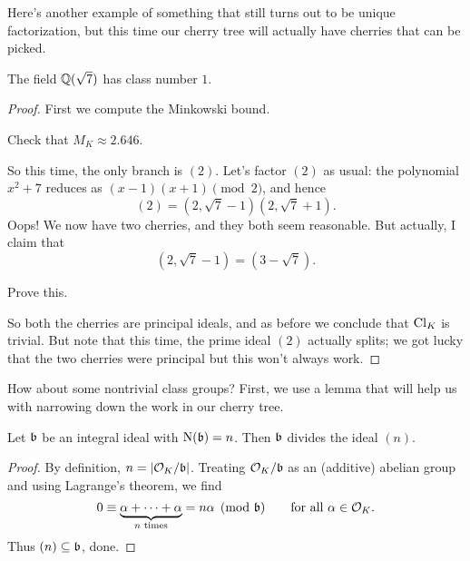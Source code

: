 Here's another example of something that still turns out to be unique factorization,
but this time our cherry tree will actually have cherries that can be picked.
\begin{proposition}[{$\ZZ[\sqrt7]$} is a UFD]
	The field $\mathbb Q(\sqrt7)$ has class number $1$.
\end{proposition}
\begin{proof}
	First we compute the Minkowski bound.
	\begin{ques}
		Check that $M_K \approx 2.646$.
	\end{ques}
	So this time, the only branch is $(2)$. Let's factor $(2)$ as usual: the polynomial $x^2+7$
	reduces as $(x-1)(x+1) \pmod 2$, and hence
	\[ (2) = \left( 2, \sqrt7-1 \right) \left( 2, \sqrt7+1 \right). \]
	Oops! We now have two cherries, and they both seem reasonable.
	But actually, I claim that
	\[ \left( 2, \sqrt7-1 \right) = \left( 3 - \sqrt 7 \right). \]
	\begin{ques}
		Prove this.
	\end{ques}
	So both the cherries are principal ideals, and as before we conclude that $\mathrm{Cl}_K$ is trivial.
	But note that this time, the prime ideal $(2)$ actually splits; we got lucky
	that the two cherries were principal but this won't always work.
\end{proof}

How about some nontrivial class groups?
First, we use a lemma that will help us with
narrowing down the work in our cherry tree.
\begin{lemma}
	Let $\mathfrak b$ be an integral ideal with $\operatorname{N}(\mathfrak b) = n$.
	Then $\mathfrak b$ divides the ideal $(n)$.
\end{lemma}
\begin{proof}
	By definition, $n = \left\lvert \mathcal O_K / \mathfrak b \right\rvert$.
	Treating $\mathcal O_K/\mathfrak b$ as an (additive) abelian group and using Lagrange's theorem, we find
	\[ 0 \equiv
		\underbrace{\alpha + \dots + \alpha}_{n\text{ times}} = n\alpha
		\pmod {\mathfrak b} \qquad\text{for all } \alpha \in \mathcal O_K. \]
	Thus $(n) \subseteq \mathfrak b$, done.
\end{proof}

